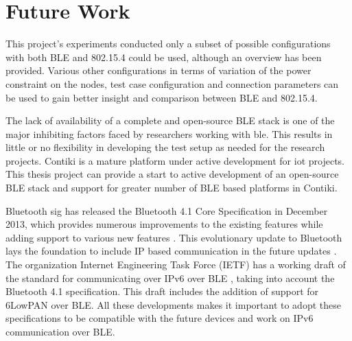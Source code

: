 %

\section{Future Work}

This project's experiments conducted only a subset of possible configurations with both BLE and 802.15.4 could be used, although an overview has been provided. Various other configurations in terms of variation of the power constraint on the nodes, test case configuration and connection parameters can be used to gain better insight and comparison between BLE and 802.15.4.

The lack of availability of a complete and open-source BLE stack is one of the major inhibiting factors faced by researchers working with \gls{ble}. This results in little or no flexibility in developing the test setup as needed for the research projects. Contiki is a mature platform under active development for \gls{iot} projects. This thesis project can provide a start to active development of an open-source BLE stack and support for greater number of BLE based platforms in Contiki.

Bluetooth \gls{sig} has released the Bluetooth 4.1 Core Specification in December 2013, which provides numerous improvements to the existing features while adding support to various new features \cite{4.1ExtendsIoT}. This evolutionary update to Bluetooth lays the foundation to include IP based communication in the future updates \cite{4.0to4.1}. The organization Internet Engineering Task Force (IETF) has a working draft of the standard for communicating over IPv6 over BLE \cite{ieftIPv6Draft}, taking into account the Bluetooth 4.1 specification. This draft includes the addition of support for 6LowPAN over BLE. All these developments makes it important to adopt these specifications to be compatible with the future devices and work on IPv6 communication over BLE. 

